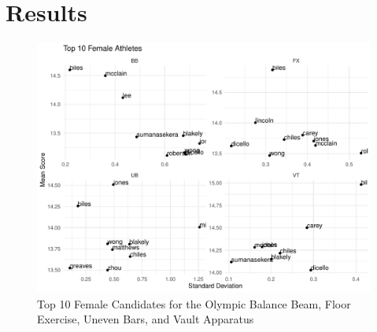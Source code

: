 \documentclass[12pt]{article}
\begin{document}
\section{Results}
\label{sec:res}

\begin{figure}
  \centering
  \includegraphics[scale=0.7]{FemaleAthleteApparatus.pdf}
  \caption{Top 10 Female Candidates for the Olympic Balance Beam, Floor Exercise, Uneven Bars, and Vault Apparatus}
  \label{fig:FA}
\end{figure}
\end{document}
